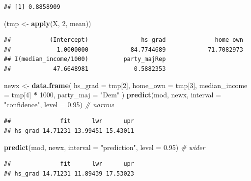 \documentclass[]{article}
\newenvironment{Shaded}{\begin{snugshade}}{\end{snugshade}}
\newcommand{\CommentTok}[1]{\textcolor[rgb]{0.56,0.35,0.01}{\textit{#1}}}
\newcommand{\DataTypeTok}[1]{\textcolor[rgb]{0.13,0.29,0.53}{#1}}
\newcommand{\DecValTok}[1]{\textcolor[rgb]{0.00,0.00,0.81}{#1}}
\newcommand{\FloatTok}[1]{\textcolor[rgb]{0.00,0.00,0.81}{#1}}
\newcommand{\KeywordTok}[1]{\textcolor[rgb]{0.13,0.29,0.53}{\textbf{#1}}}
\newcommand{\NormalTok}[1]{#1}
\newcommand{\OperatorTok}[1]{\textcolor[rgb]{0.81,0.36,0.00}{\textbf{#1}}}
\newcommand{\StringTok}[1]{\textcolor[rgb]{0.31,0.60,0.02}{#1}}
\begin{document}
\begin{verbatim}
## [1] 0.8858909
\end{verbatim}

\begin{Shaded}
\begin{Highlighting}[]
\NormalTok{(tmp <-}\StringTok{ }\KeywordTok{apply}\NormalTok{(X, }\DecValTok{2}\NormalTok{, mean))}
\end{Highlighting}
\end{Shaded}

\begin{verbatim}
##           (Intercept)               hs_grad              home_own 
##             1.0000000            84.7744689            71.7082973 
## I(median_income/1000)          party_majRep 
##            47.6648981             0.5882353
\end{verbatim}

\begin{Shaded}
\begin{Highlighting}[]
\NormalTok{newx <-}\StringTok{ }\KeywordTok{data.frame}\NormalTok{(}
  \DataTypeTok{hs_grad =}\NormalTok{ tmp[}\DecValTok{2}\NormalTok{],}
  \DataTypeTok{home_own =}\NormalTok{ tmp[}\DecValTok{3}\NormalTok{],}
  \DataTypeTok{median_income =}\NormalTok{ tmp[}\DecValTok{4}\NormalTok{] }\OperatorTok{*}\StringTok{ }\DecValTok{1000}\NormalTok{,}
  \DataTypeTok{party_maj =} \StringTok{"Dem"}
\NormalTok{)}
\KeywordTok{predict}\NormalTok{(mod, newx, }\DataTypeTok{interval =} \StringTok{"confidence"}\NormalTok{, }\DataTypeTok{level =} \FloatTok{0.95}\NormalTok{)  }\CommentTok{# narrow}
\end{Highlighting}
\end{Shaded}

\begin{verbatim}
##              fit      lwr      upr
## hs_grad 14.71231 13.99451 15.43011
\end{verbatim}

\begin{Shaded}
\begin{Highlighting}[]
\KeywordTok{predict}\NormalTok{(mod, newx, }\DataTypeTok{interval =} \StringTok{"prediction"}\NormalTok{, }\DataTypeTok{level =} \FloatTok{0.95}\NormalTok{)  }\CommentTok{# wider}
\end{Highlighting}
\end{Shaded}

\begin{verbatim}
##              fit      lwr      upr
## hs_grad 14.71231 11.89439 17.53023
\end{verbatim}
\end{document}
